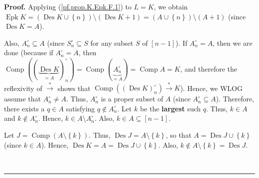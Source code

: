 \documentclass[numbers=enddot,12pt,final,onecolumn,notitlepage]{scrartcl}%
\theoremstyle{definition}
\newenvironment{proof}[1][Proof]{\noindent\textbf{#1.} }{\ \rule{0.5em}{0.5em}}
\newenvironment{verlong}{}{}
\begin{document}
\begin{verlong}
\begin{proof}
Applying (\ref{pf.prop.K.Epk.F.1}) to $L=K$, we obtain $\operatorname{Epk}%
K=\left(  \operatorname{Des}K\cup\left\{  n\right\}  \right)  \setminus
\left(  \operatorname{Des}K+1\right)  =\left(  A\cup\left\{  n\right\}
\right)  \setminus\left(  A+1\right)  $ (since $\operatorname{Des}K=A$).

Also, $A_{n}^{\circ}\subseteq A$ (since $S_{n}^{\circ}\subseteq S$ for any
subset $S$ of $\left[  n-1\right]  $). If $A_{n}^{\circ}=A$, then we are done
(because if $A_{n}^{\circ}=A$, then $\operatorname*{Comp}\left(  \left(
\underbrace{\operatorname{Des}K}_{=A}\right)  _{n}^{\circ}\right)
=\operatorname*{Comp}\left(  \underbrace{A_{n}^{\circ}}_{=A}\right)
=\operatorname*{Comp}A=K$, and therefore the reflexivity of $\overset{\ast
}{\rightarrow}$ shows that $\operatorname*{Comp}\left(  \left(
\operatorname{Des}K\right)  _{n}^{\circ}\right)  \overset{\ast}{\rightarrow
}K$). Hence, we WLOG assume that $A_{n}^{\circ}\neq A$. Thus, $A_{n}^{\circ}$
is a proper subset of $A$ (since $A_{n}^{\circ}\subseteq A$). Therefore, there
exists a $q\in A$ satisfying $q\notin A_{n}^{\circ}$. Let $k$ be the
\textbf{largest} such $q$. Thus, $k\in A$ and $k\notin A_{n}^{\circ}$. Hence,
$k\in A\setminus A_{n}^{\circ}$. Also, $k\in A\subseteq\left[  n-1\right]  $.

Let $J=\operatorname*{Comp}\left(  A\setminus\left\{  k\right\}  \right)  $.
Thus, $\operatorname{Des}J=A\setminus\left\{  k\right\}  $, so that
$A=\operatorname{Des}J\cup\left\{  k\right\}  $ (since $k\in A$). Hence,
$\operatorname{Des}K=A=\operatorname{Des}J\cup\left\{  k\right\}  $. Also,
$k\notin A\setminus\left\{  k\right\}  =\operatorname{Des}J$.


\end{proof}
\end{verlong}
\end{document}
